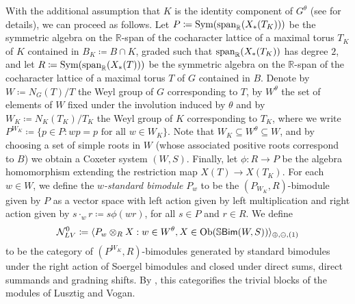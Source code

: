 \noindent With the additional assumption that $K$ is the identity component of $G^\theta$ (see \cite{LR22} for details), we can proceed as follows. Let $P \coloneqq \textnormal{Sym}(\textnormal{span}_\mathbb{R}(X_*(T_K)))$ be the symmetric algebra on the $\mathbb{R}$-span of the cocharacter lattice of a maximal torus $T_K$ of $K$ contained in $B_K \coloneqq B \cap K$, graded such that $\textnormal{span}_\mathbb{R}(X_*(T_K))$ has degree $2$, and let $R \coloneqq \textnormal{Sym}(\textnormal{span}_\mathbb{R}(X_*(T)))$ be the symmetric algebra on the $\mathbb{R}$-span of the cocharacter lattice of a maximal torus $T$ of $G$ contained in $B$. Denote by $W \coloneqq N_G(T)/T$ the Weyl group of $G$ corresponding to $T$, by $W^\theta$ the set of elements of $W$ fixed under the involution induced by $\theta$ and by $W_K \coloneqq N_K(T_K)/T_K$ the Weyl group of $K$ corresponding to $T_K$, where we write $P^{W_K} \coloneqq \{p \in P : wp = p\text{ for all }w \in W_K\}$. Note that $W_K \subseteq W^\theta \subseteq W$, and by choosing a set of simple roots in $W$ (whose associated positive roots correspond to $B$) we obtain a Coxeter system $(W, S)$. Finally, let $\phi : R \to P$ be the algebra homomorphism extending the restriction map $X(T) \to X(T_K)$. For each $w \in W$, we define the {\em $w$-standard bimodule} $P_w$ to be the $(P_{W_K}, R)$-bimodule given by $P$ as a vector space with left action given by left multiplication and right action given by $s\cdot_w r \coloneqq s\phi(wr)$, for all $s \in P$ and $r \in R$. We define\\[-1.1\linespacing]
\begin{align*}
\begin{split}
\mathcal{N}_{LV}^0 \coloneqq \langle P_w \otimes_R X : w \in W^\theta, X \in \textnormal{Ob}(\mathbb{S}\textnormal{\textsf{Bim}}(W, S))\rangle_{\oplus,\ominus,(1)}
\end{split}
\end{align*}
\noindent to be the category of $(P^{W_K}, R)$-bimodules generated by standard bimodules under the right action of Soergel bimodules and closed under direct sums, direct summands and gradning shifts. By \cite[Theorem 1.3.1]{LR22}, this categorifies the trivial blocks of the modules of Lusztig and Vogan.\\

